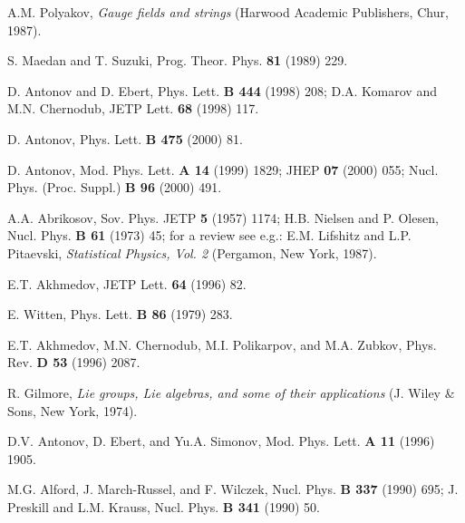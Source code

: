 \documentclass[a4paper,12pt]{article}
\begin{document}
\begin{thebibliography}{99}
A.M. Polyakov, {\it Gauge fields and strings} (Harwood Academic Publishers, Chur, 1987).

S. Maedan and T. Suzuki, Prog. Theor. Phys. {\bf 81} (1989) 229.

D. Antonov and D. Ebert, Phys. Lett. {\bf B 444} (1998) 208;
D.A. Komarov and M.N. Chernodub, JETP Lett. {\bf 68} (1998) 117.

D. Antonov, Phys. Lett. {\bf B 475} (2000) 81.

D. Antonov, Mod. Phys. Lett. {\bf A 14} (1999) 1829; JHEP {\bf 07} (2000) 055;
Nucl. Phys. (Proc. Suppl.) {\bf B 96} (2000) 491.

A.A. Abrikosov, Sov. Phys. JETP {\bf 5} (1957) 1174;
H.B. Nielsen and P. Olesen, Nucl. Phys. {\bf B 61} (1973) 45;
for a review see e.g.: E.M. Lifshitz and L.P. Pitaevski,
{\it Statistical Physics, Vol. 2} (Pergamon, New York, 1987).

E.T. Akhmedov, JETP Lett. {\bf 64} (1996) 82.

E. Witten, Phys. Lett. {\bf B 86} (1979) 283.

E.T. Akhmedov, M.N. Chernodub, M.I. Polikarpov, and M.A. Zubkov,
Phys. Rev. {\bf D 53} (1996) 2087.

R. Gilmore, {\it Lie groups, Lie algebras, and some of their applications}
(J. Wiley \& Sons, New York, 1974).

D.V. Antonov, D. Ebert, and Yu.A. Simonov, Mod. Phys. Lett. {\bf A 11} (1996) 1905.

M.G. Alford, J. March-Russel, and F. Wilczek, Nucl. Phys.
{\bf B 337} (1990) 695; J. Preskill and L.M. Krauss, Nucl. Phys.
{\bf B 341} (1990) 50.







\end{thebibliography}
\end{document}
